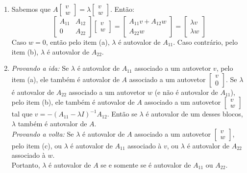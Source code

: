 \documentclass[a4paper,11pt]{article}
\begin{document}
\begin{enumerate}[label=\textbf{(\alph*)}]
            \item  Sabemos que $A\begin{bmatrix} v \\ w \end{bmatrix} = \lambda \begin{bmatrix} v \\ w \end{bmatrix} $. Então:
                $$
                    \begin{bmatrix}
                        A_{11} & A_{12} \\
                        0 & A_{22}
                    \end{bmatrix}
                    \begin{bmatrix}
                        v \\
                        w
                    \end{bmatrix}
                    =
                    \begin{bmatrix}
                        A_{11}v + A_{12}w \\
                        A_{22}w
                    \end{bmatrix}
                    =
                    \begin{bmatrix}
                        \lambda v \\
                        \lambda w
                    \end{bmatrix}
                $$
                Caso $w = 0$, então pelo item (a), $\lambda$ é autovalor de $A_{11}$. Caso contrário, pelo item (b), $\lambda$ é autovalor de $A_{22}$.
            
            \item \textit{Provando a ida:} Se $\lambda$ é autovalor de $A_{11}$ associado a um autovetor $v$, pelo item (a), ele também é autovalor de $A$ associado a um autovetor $\begin{bmatrix} v \\ 0 \end{bmatrix}$. Se $\lambda$ é autovalor de $A_{22}$ associado a um autovetor $w$ (e não é autovalor de $A_{11}$), pelo item (b), ele também é autovalor de $A$ associado a um autovetor $\begin{bmatrix} v \\ w \end{bmatrix}$ tal que $v = -(A_{11} - \lambda I)^{-1}A_{12}$. Então se $\lambda$ é autovalor de um desses blocos, $\lambda$ também é autovalor de $A$. \\
                \textit{Provando a volta:} Se $\lambda$ é autovalor de $A$ associado a um autovetor $\begin{bmatrix} v \\ w \end{bmatrix}$, pelo item (c), ou $\lambda$ é autovalor de $A_{11}$ associado à $v$, ou $\lambda$ é autovalor de $A_{22}$ associado à $w$. \\
                Portanto, $\lambda$ é autovalor de $A$ se e somente se é autovalor de $A_{11}$ ou $A_{22}$.
            
        \end{enumerate}
        
\end{document}
